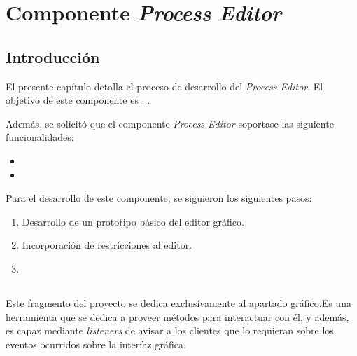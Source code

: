 \chapter{Componente \emph{Process Editor}}

\section{Introducción}


El presente capítulo detalla el proceso de desarrollo del \emph{Process Editor}. El objetivo de este componente es ...

Además, se solicitó que el componente \emph{Process Editor} soportase las siguiente funcionalidades: 

\begin{itemize}
    \item
    \item 
\end{itemize}

Para el desarrollo de este componente, se siguieron los siguientes pasos:

\begin{enumerate}
    \item Desarrollo de un prototipo básico del editor gráfico.
    \item Incorporación de restricciones al editor.
    \item 
\end{enumerate}

\section{}





	
	

Este fragmento del proyecto se dedica exclusivamente al apartado gráfico.Es una herramienta que se dedica a proveer métodos para interactuar con él, y además, es capaz mediante \emph{listeners} de avisar a los clientes que lo requieran sobre los eventos ocurridos sobre la interfaz gráfica.


